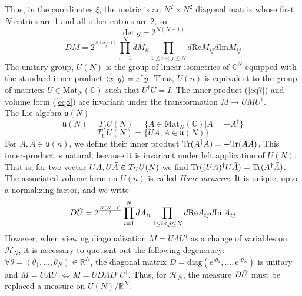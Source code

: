 \documentclass[12pt]{article}
\theoremstyle{definition}
\begin{document}
\begin{enumerate}
\begin{itemize}
        Thus, in the coordinates $\xi$, the metric is an $N^2\times N^2$ diagonal matrix whose first $N$ entries are 1 and all other entries are $2$, so
        \begin{equation}
            \det g=2^{N(N-1)}
        \end{equation}
        \begin{equation}\label{eq8}
            DM=2^{\frac{N(N-1)}{2}}\prod\limits_{i=1}^NdM_{ii}\prod\limits_{1\leq i<j\leq N}d\text{Re}M_{ij}d\text{Im}M_{ij}
        \end{equation}
        The unitary group, $U(N)$ is the group of linear isometries of $\mathbb{C}^N$ equipped with the standard inner-product $\braket{x,y}=x^\dagger y$. Thus, $U(n)$ is equivalent to the group of matrices $U\in\text{Mat}_N(\mathbb{C})$ such that $U^\dagger U = I$. The inner-product (\ref{eq7}) and volume form (\ref{eq8}) are invariant under the transformation $M\rightarrow UMU^\dagger$.\\
        The Lie algebra $\mathfrak{u}(N)$
        \begin{equation}
            \mathfrak{u}(N)=T_IU(N)=\{A\in\text{Mat}_N(\mathbb{C})|A=-A^\dagger\}
        \end{equation}
        \begin{equation}
            T_UU(N)=\{UA,A\in\mathfrak{u}(N)\}
        \end{equation}
        For $A,\tilde{A}\in\mathfrak{u}(n)$, we define their inner product $\text{Tr}(A^\dagger\Tilde{A})=-\text{Tr}(A\Tilde{A})$. This inner-product is natural, because it is invariant under left application of $U(N)$. That is, for two vector $UA,U\Tilde{A}\in T_UU(N)$ we find $\text{Tr}((UA)^\dagger U\Tilde{A})=\text{Tr}(A^\dagger\Tilde{A})$. The associated volume form on $U(n)$ is called \textit{Haar measure}. It is unique, upto a normalizing factor, and we write
        \begin{equation}
            D\Tilde{U}=2^{\frac{N(N-1)}{2}}\prod\limits_{i=1}^NdA_{ii}\prod\limits_{1\leq i<j\leq N}d\text{Re}A_{ij}d\text{Im}A_{ij}
        \end{equation}
        However, when viewing diagonalization $M=U\Lambda U^\dagger$ as a change of variables on $\mathcal{H}_N$, it is necessary to quotient out the following degeneracy: $\forall\theta=(\theta_1,...,\theta_N)\in\mathbb{R}^N$, the diagonal matrix $D = \text{diag}(e^{i\theta_1},...,e^{i\theta_N})$ is unitary and $M = U\Lambda U^\dagger\Leftrightarrow M = UD\Lambda D^\dagger U^\dagger$. Thus, for $\mathcal{H}_N$, the measure $D\Tilde{U}$ must be replaced a measure on $U(N)/\mathbb{R}^N$.

\end{itemize}
\end{enumerate}
\end{document}
